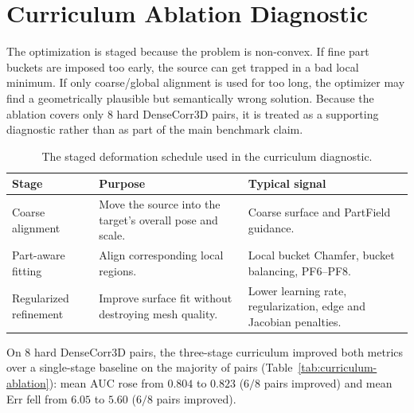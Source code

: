 \documentclass{article}
\begin{document}
\section{Curriculum Ablation Diagnostic}
\label{app:curriculum-ablation}

The optimization is staged because the problem is non-convex. If fine part buckets are imposed too
early, the source can get trapped in a bad local minimum. If only coarse/global alignment is used
for too long, the optimizer may find a geometrically plausible but semantically wrong solution.
Because the ablation covers only 8 hard DenseCorr3D pairs, it is treated as a supporting diagnostic
rather than as part of the main benchmark claim.

\begin{table}[H]
\centering
\small
\begin{tabularx}{\textwidth}{>{\raggedright\arraybackslash}X>{\raggedright\arraybackslash}X>{\raggedright\arraybackslash}X}
\toprule
Stage & Purpose & Typical signal \\
\midrule
Coarse alignment & Move the source into the target's overall pose and scale. & Coarse surface and PartField guidance. \\
Part-aware fitting & Align corresponding local regions. & Local bucket Chamfer, bucket balancing, PF6--PF8. \\
Regularized refinement & Improve surface fit without destroying mesh quality. & Lower learning rate, regularization, edge and Jacobian penalties. \\
\bottomrule
\end{tabularx}
\caption{The staged deformation schedule used in the curriculum diagnostic.}
\label{tab:curriculum}
\end{table}

On 8 hard DenseCorr3D pairs, the three-stage curriculum improved both metrics over a single-stage
baseline on the majority of pairs (Table~\ref{tab:curriculum-ablation}): mean AUC rose from $0.804$
to $0.823$ ($6/8$ pairs improved) and mean Err fell from $6.05$ to $5.60$ ($6/8$ pairs improved).
\end{document}
